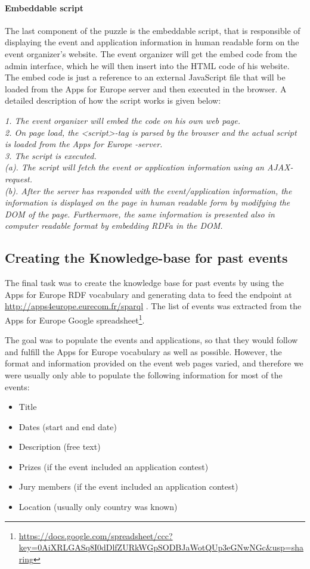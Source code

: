 \paragraph{Embeddable script}
The last component of the puzzle is the embeddable script, that is responsible of displaying the event and application information in human readable form on the event organizer's website. The event organizer will get the embed code from the admin interface, which he will then insert into the HTML code of his website. The embed code is just a reference to an external JavaScript file that will be loaded from the Apps for Europe server and then executed in the browser. A detailed description of how the script works is given below:
\begin{algorithm}
\textsl{
1. The event organizer will embed the code on his own web page.\\
2. On page load, the <script>-tag is parsed by the browser and the actual script is loaded from the Apps for Europe -server.\\
3.	The script is executed.\\
(a).	The script will fetch the event or application information using an AJAX-request.\\
(b).	After the server has responded with the event/application information, the information is displayed on the page in human readable form by modifying the DOM of the page. Furthermore, the same information is presented also in computer readable format by embedding RDFa in the DOM.
}

\end{algorithm}


\subsection{Creating the Knowledge-base for past events}
The final task was to create the knowledge base for past events by using the Apps for Europe RDF vocabulary and generating data to feed the endpoint at \url{http://apps4europe.eurecom.fr/sparql} . The list of events was extracted from the Apps for Europe Google spreadsheet\footnote{\url{https://docs.google.com/spreadsheet/ccc?key=0AiXRLGASq8I0dDlfZURkWGpSODBJaWotQUp3eGNwNGc&usp=sharing}}.

The goal was to populate the events and applications, so that they would follow and fulfill the Apps for Europe vocabulary as well as possible. However, the format and information provided on the event web pages varied, and therefore we were usually only able to populate the following information for most of the events:
\begin{itemize}
\item Title
\item Dates (start and end date)
\item Description (free text)
\item Prizes (if the event included an application contest)
\item Jury members (if the event included an application contest)
\item Location (usually only country was known)
\end{itemize}

